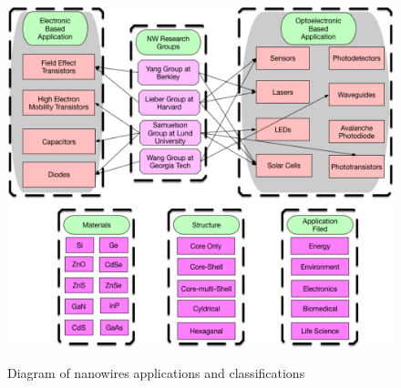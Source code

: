 \begin{figure}
  \caption{Diagram of nanowires applications and classifications}
  \centering
  \includegraphics[width=\textwidth]{pictures/Introduction/NWApplication}
  \label{NWApplication}
\end{figure}


